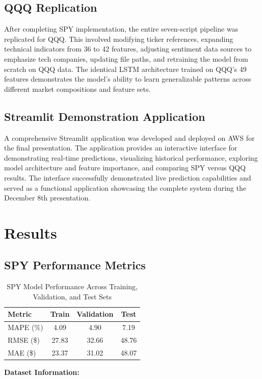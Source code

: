 \documentclass[12pt,letterpaper]{article}
\begin{document}
\subsection{QQQ Replication}

After completing SPY implementation, the entire seven-script pipeline was replicated for QQQ. This involved modifying ticker references, expanding technical indicators from 36 to 42 features, adjusting sentiment data sources to emphasize tech companies, updating file paths, and retraining the model from scratch on QQQ data. The identical LSTM architecture trained on QQQ's 49 features demonstrates the model's ability to learn generalizable patterns across different market compositions and feature sets.

\subsection{Streamlit Demonstration Application}

A comprehensive Streamlit application was developed and deployed on AWS for the final presentation. The application provides an interactive interface for demonstrating real-time predictions, visualizing historical performance, exploring model architecture and feature importance, and comparing SPY versus QQQ results. The interface successfully demonstrated live prediction capabilities and served as a functional application showcasing the complete system during the December 8th presentation.

\section{Results}

\subsection{SPY Performance Metrics}
\begin{table}[h]
\centering
\caption{SPY Model Performance Across Training, Validation, and Test Sets}
\vspace{0.2cm}
\begin{tabular}{lccc}
\toprule
\textbf{Metric} & \textbf{Train} & \textbf{Validation} & \textbf{Test} \\
\midrule
MAPE (\%) & 4.09 & 4.90 & 7.19 \\
RMSE (\$) & 27.83 & 32.66 & 48.76 \\
MAE (\$) & 23.37 & 31.02 & 48.07 \\
\bottomrule
\end{tabular}
\label{tab:spy_performance}
\end{table}
\textbf{Dataset Information:}
\end{document}
